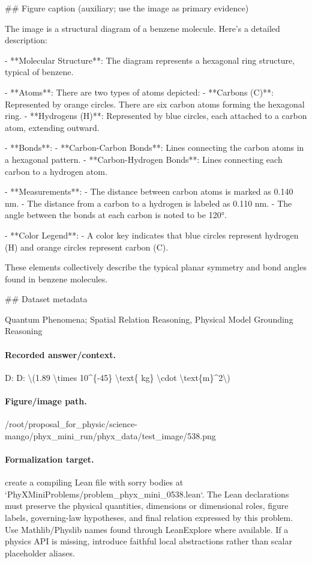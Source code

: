 \#\# Figure caption (auxiliary; use the image as primary evidence)

The image is a structural diagram of a benzene molecule. Here's a detailed description:

- **Molecular Structure**: The diagram represents a hexagonal ring structure, typical of benzene.

- **Atoms**: There are two types of atoms depicted:
  - **Carbons (C)**: Represented by orange circles. There are six carbon atoms forming the hexagonal ring.
  - **Hydrogens (H)**: Represented by blue circles, each attached to a carbon atom, extending outward.

- **Bonds**:
  - **Carbon-Carbon Bonds**: Lines connecting the carbon atoms in a hexagonal pattern.
  - **Carbon-Hydrogen Bonds**: Lines connecting each carbon to a hydrogen atom.

- **Measurements**:
  - The distance between carbon atoms is marked as 0.140 nm.
  - The distance from a carbon to a hydrogen is labeled as 0.110 nm.
  - The angle between the bonds at each carbon is noted to be 120°.

- **Color Legend**:
  - A color key indicates that blue circles represent hydrogen (H) and orange circles represent carbon (C).

These elements collectively describe the typical planar symmetry and bond angles found in benzene molecules.

\#\# Dataset metadata

Quantum Phenomena; Spatial Relation Reasoning, Physical Model Grounding Reasoning

\paragraph{Recorded answer/context.}
D: D: \textbackslash{}(1.89 \textbackslash{}times 10\textasciicircum{}\{-45\} \textbackslash{}text\{ kg\} \textbackslash{}cdot \textbackslash{}text\{m\}\textasciicircum{}2\textbackslash{})

\paragraph{Figure/image path.}
/root/proposal\_for\_physic/science-mango/phyx\_mini\_run/phyx\_data/test\_image/538.png

\paragraph{Formalization target.}
create a compiling Lean file with sorry bodies at `PhyXMiniProblems/problem\_phyx\_mini\_0538.lean`. The Lean declarations must preserve the physical quantities, dimensions or dimensional roles, figure labels, governing-law hypotheses, and final relation expressed by this problem.
Use Mathlib/Physlib names found through LeanExplore where available. If a physics API is missing, introduce faithful local abstractions rather than scalar placeholder aliases.

